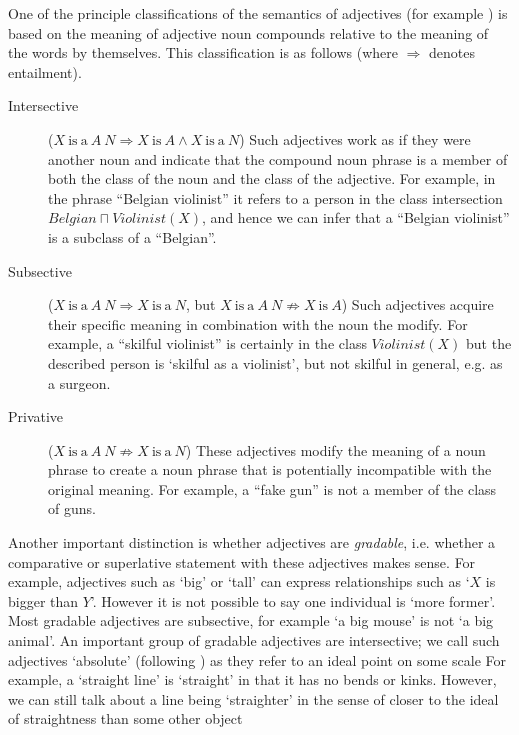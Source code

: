 \documentclass[11pt]{article}
\begin{document}
One of the principle classifications of the semantics of adjectives (for example \cite{partee2003there,bouillon1999description,morzycki2013modification}) is based on the meaning of adjective noun compounds relative to the meaning of the words by themselves. This classification is as follows (where $\Rightarrow$ denotes entailment).

\begin{description}
\item[Intersective] ($X\mathrm{~is~a~}A~N \Rightarrow X\mathrm{~is~}A \wedge  X\mathrm{~is~a~}N$) 
Such adjectives work as if they were another noun and indicate that the compound 
noun phrase is a member of both the class of the noun and the class of the 
adjective. For example, in the phrase ``Belgian violinist'' it refers to a 
person in the class intersection $Belgian \sqcap Violinist(X)$, and hence we 
can infer that a ``Belgian violinist'' is a subclass of a ``Belgian''. 

\item[Subsective] ($X\mathrm{~is~a~}A~N \Rightarrow X\mathrm{~is~a~}N$, but $X\mathrm{~is~a~}A~N \not\Rightarrow X\mathrm{~is~}A$) 
Such adjectives acquire their specific meaning in combination with the noun the modify. For example, a ``skilful 
violinist'' is certainly in the class $Violinist(X)$ but the described person is `skilful as a violinist', but not skilful in general, e.g. as a surgeon.

\item[Privative] ($X\mathrm{~is~a~}A~N \not\Rightarrow X\mathrm{~is~a~}N$) 
These adjectives modify the meaning of a noun phrase to create a noun phrase 
that is potentially incompatible with the original meaning. For example, a 
``fake gun'' is not a member of the class of guns.
\end{description}

%
%

Another important distinction is whether adjectives are 
\emph{gradable}, i.e. whether a comparative 
or superlative statement with these adjectives makes sense. For example, adjectives such as 
`big' or `tall' can express relationships such as `$X$ is bigger than $Y$'. 
However it is not possible to say one individual is `more former'. Most gradable 
adjectives are subsective, for example `a big mouse' is not `a big animal'\cite{morzycki2013nonscales}. An 
important group of gradable adjectives are intersective; we call 
such adjectives `absolute' (following \cite{rusiecki1985adjectives}) as they 
refer to an ideal point on some scale For example, a `straight line' is `straight' in 
that it has no bends or kinks. However, we can still talk about a line being 
`straighter' in the sense of closer to the ideal of straightness than some other object
\end{document}
